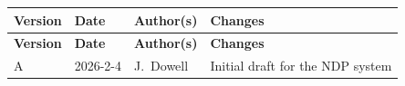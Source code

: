 
\changerecordheader

\begin{longtable}{|p{1.5cm}|p{2.5cm}|p{3cm}|p{7cm}|}
    \hline
    \textbf{Version} & \textbf{Date} & \textbf{Author(s)} & \textbf{Changes} \\
    \hline
    \endfirsthead

    \hline
    \textbf{Version} & \textbf{Date} & \textbf{Author(s)} & \textbf{Changes} \\
    \hline
    \endhead

    \hline
    \endfoot

    A & 2026-2-4 & J.~Dowell & Initial draft for the NDP system \\
    \hline

\end{longtable}
